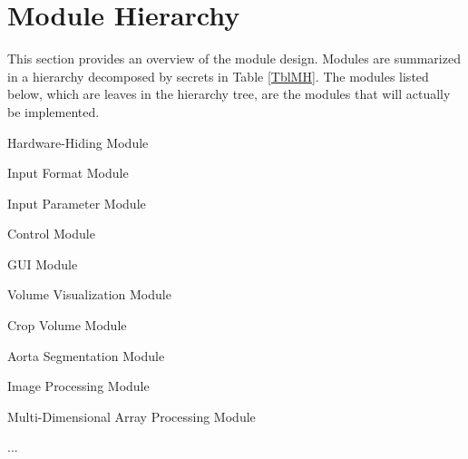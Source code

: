 \documentclass[12pt, titlepage]{article}
\newcounter{mnum}
\newcommand{\mthemnum}{M\themnum}
\begin{document}
\section{Module Hierarchy} \label{SecMH}

This section provides an overview of the module design. Modules are summarized
in a hierarchy decomposed by secrets in Table \ref{TblMH}. The modules listed
below, which are leaves in the hierarchy tree, are the modules that will
actually be implemented.

\begin{description}
\item [ \mthemnum \label{mHH}:] Hardware-Hiding Module
\item [ \mthemnum \label{mInput}:] Input Format Module
\item [ \mthemnum \label{mParams}:] Input Parameter Module
\item [ \mthemnum \label{mControl}:] Control Module
\item [ \mthemnum \label{mGUI}:] GUI Module
\item [ \mthemnum \label{mVV}:] Volume Visualization Module
\item [ \mthemnum \label{mROI}:] Crop Volume Module
\item [ \mthemnum \label{mAortaSeg}:] Aorta Segmentation Module
\item [ \mthemnum \label{mIP}:] Image Processing Module
\item [ \mthemnum \label{mNDAP}:] Multi-Dimensional Array Processing Module
\item ...
\end{description}
\end{document}
